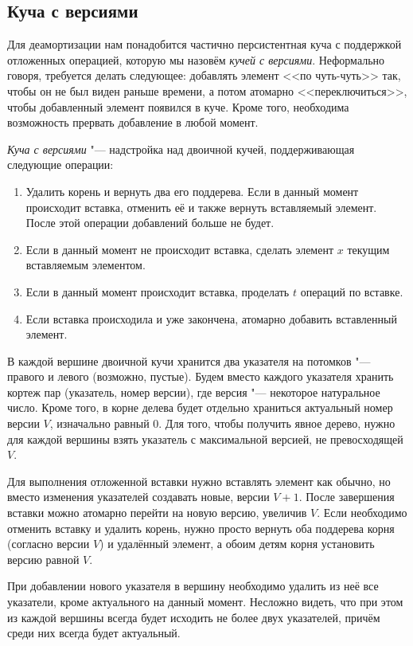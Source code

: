 \subsection{Куча с версиями}
Для деамортизации нам понадобится частично персистентная куча с поддержкой
отложенных операцией, которую мы назовём \emph{кучей с версиями}.
Неформально говоря, требуется делать следующее: добавлять элемент <<по чуть-чуть>>
так, чтобы он не был виден раньше времени, а потом атомарно <<переключиться>>,
чтобы добавленный элемент появился в куче. Кроме того, необходима возможность
прервать добавление в любой момент.

\begin{definition}
\emph{Куча с версиями} "--- надстройка над двоичной кучей,
поддерживающая следующие операции:
\begin{enumerate}
\item Удалить корень и вернуть два его поддерева. Если в данный момент происходит
    вставка, отменить её и также вернуть вставляемый элемент. После этой операции
    добавлений больше не будет.
\item Если в данный момент не происходит вставка, сделать элемент $x$
    текущим вставляемым элементом.
\item Если в данный момент происходит вставка, проделать $t$ операций по вставке.
\item Если вставка происходила и уже закончена, атомарно добавить вставленный элемент.
\end{enumerate}
\end{definition}

В каждой вершине двоичной кучи хранится два указателя на потомков "--- правого
и левого (возможно, пустые). Будем вместо каждого указателя хранить кортеж
пар (указатель, номер версии), где версия "--- некоторое натуральное число.
Кроме того, в корне делева будет отдельно храниться актуальный номер версии $V$,
изначально равный $0$.
Для того, чтобы получить явное дерево, нужно для каждой вершины взять
указатель с максимальной версией, не превосходящей $V$.

Для выполнения отложенной вставки нужно вставлять элемент как обычно, но вместо
изменения указателей создавать новые, версии $V+1$. После завершения вставки
можно атомарно перейти на новую версию, увеличив $V$. Если необходимо отменить
вставку и удалить корень, нужно просто вернуть оба поддерева корня (согласно версии
$V$) и удалённый элемент, а обоим детям корня установить версию равной $V$.

При добавлении нового указателя в вершину необходимо удалить из неё все указатели,
кроме актуального на данный момент. Несложно видеть, что при этом из каждой
вершины всегда будет исходить не более двух указателей, причём среди них
всегда будет актуальный.
